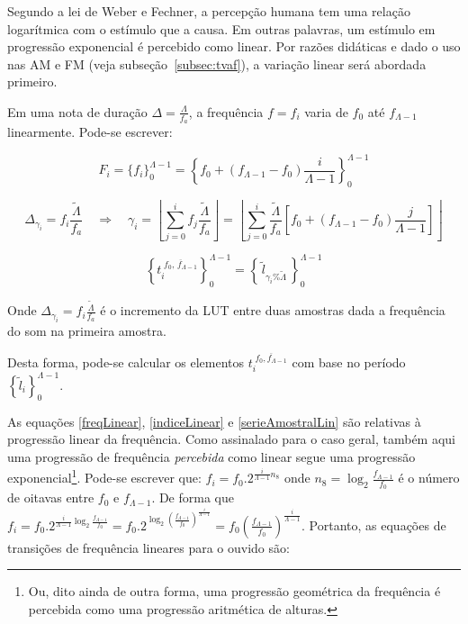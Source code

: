 Segundo a lei de Weber e Fechner, a percepção humana tem uma relação logarítmica com
o estímulo que a causa.\cite{Weber-Fechner} Em outras palavras, um estímulo em progressão exponencial
é percebido como linear.
Por razões didáticas e dado o uso nas AM e FM (veja subseção~\ref{subsec:tvaf}), a variação linear será abordada primeiro.

Em uma nota de duração $\Delta = \frac{\Lambda}{f_a}$, a frequência $f=f_i$ varia de $f_0$ até $f_{\Lambda -1}$
linearmente. Pode-se escrever:

\begin{equation}\label{freqLinear}
F_i=\{f_i\}_0^{\Lambda-1}=\left\{f_0 + (f_{\Lambda-1}-f_0)\frac{i}{\Lambda-1} \right\}_0^{\Lambda-1}
\end{equation}

\begin{equation}\label{indiceLinear}
\Delta_{\gamma_i}=f_i\frac{\widetilde{\Lambda}}{f_a} \quad \Rightarrow \quad \gamma_i=\left \lfloor \sum_{j=0}^{i} f_j\frac{\widetilde{\Lambda}}{f_a} \right \rfloor   =\left \lfloor \sum_{j=0}^{i} \frac{\widetilde{\Lambda}}{f_a} \left [f_0 + (f_{\Lambda-1}-f_0)\frac{j}{\Lambda-1} \right ] \right \rfloor 
\end{equation}

\begin{equation}\label{serieAmostralLin}
\left\{t_i^{\;\overline{f_0,\, f_{\Lambda-1}}}\right\}_0^{\Lambda-1}=\left\{\,\widetilde{l}_{\gamma_i \% \widetilde{\Lambda}}\,\right\}_0^{\Lambda-1}
\end{equation}

Onde $\Delta_{\gamma_i}=f_i\frac{\widetilde{\Lambda}}{f_a}$ é o incremento da LUT entre duas amostras dada a frequência do som na primeira amostra.

Desta forma, pode-se calcular os elementos $t_i^{\;\overline{f_0,f_{\Lambda-1}}}$
com base no período $\left\{\widetilde{l}_i\right\}_0^{\Lambda-1}$.

As equações \ref{freqLinear}, \ref{indiceLinear} e \ref{serieAmostralLin} são relativas à progressão linear
da frequência. Como assinalado para o caso geral, também aqui
uma progressão de frequência
\emph{percebida} como linear segue uma progressão exponencial\footnote{Ou,
dito ainda de outra forma, uma progressão geométrica da frequência
é percebida como uma progressão aritmética de alturas.}.
Pode-se escrever que: $f_i=f_0 . 2^{\frac{i}{\Lambda-1} n_8}$ onde 
$n_8=\log_2\frac{f_{\Lambda-1}}{f_0}$ é o número de oitavas entre $f_0$ e $f_{\Lambda-1}$.
De forma que $f_i=f_0 . 2^{\frac{i}{\Lambda-1}\log_2\frac{f_{\Lambda-1}}{f_0}}=
f_0 . 2^{\log_2\left ( \frac{f_{\Lambda-1}}{f_0} \right )^{\frac{i}{\Lambda-1}}}=
f_0 \left ( \frac{f_{\Lambda-1}}{f_0} \right ) ^{\frac{i}{\Lambda -1}}$. Portanto,
 as equações de transições de frequência
lineares para o ouvido são:

